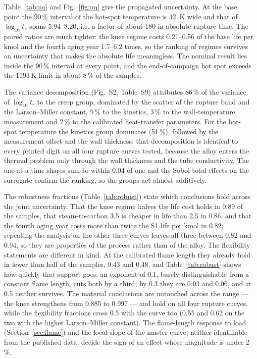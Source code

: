 \documentclass[final,3p,times]{elsarticle}
\begin{document}
Table~\ref{tab:uq} and Fig.~\ref{fig:uq} give the propagated uncertainty. At the base point the 90\,\% interval of the hot-spot temperature is 42~K wide and that of $\log_{10} t_r$ spans 5.94--8.20, i.e. a factor of about 180 in absolute rupture time. The paired ratios are much tighter: the knee regime costs 0.21--0.56 of the base life per kmol and the fourth aging year 1.7--6.2 times, so the ranking of regimes survives an uncertainty that makes the absolute life meaningless. The nominal result lies inside the 90\,\% interval at every point, and the end-of-campaign hot spot exceeds the 1193\,K limit in about 8\,\% of the samples.

The variance decomposition (Fig.~S2, Table~S9) attributes 86\,\% of the variance of $\log_{10} t_r$ to the creep group, dominated by the scatter of the rupture band and the Larson--Miller constant, 9\,\% to the kinetics, 3\,\% to the wall-temperature measurement and 2\,\% to the calibrated heat-transfer parameters. For the hot-spot temperature the kinetics group dominates (51\,\%), followed by the measurement offset and the wall thickness; that decomposition is identical to every printed digit on all four rupture curves tested, because the alloy enters the thermal problem only through the wall thickness and the tube conductivity. The one-at-a-time shares sum to within 0.04 of one and the Sobol total effects on the surrogate confirm the ranking, so the groups act almost additively.

The robustness fractions (Table~\ref{tab:robust}) state which conclusions hold across the joint uncertainty. That the knee regime halves the life cost holds in 0.89 of the samples, that steam-to-carbon 3.5 is cheaper in life than 2.5 in 0.86, and that the fourth aging year costs more than twice the S1 life per kmol in 0.82; repeating the analysis on the other three curves leaves all three between 0.82 and 0.94, so they are properties of the process rather than of the alloy. The flexibility statements are different in kind. At the calibrated flame length they already hold in fewer than half of the samples, 0.43 and 0.48, and Table~\ref{tab:robust} shows how quickly that support goes: an exponent of 0.1, barely distinguishable from a constant flame length, cuts both by a third; by 0.3 they are 0.03 and 0.06, and at 0.5 neither survives. The material conclusions are untouched across the range --- the knee strengthens from 0.885 to 0.997 --- and hold on all four rupture curves, while the flexibility fractions cross 0.5 with the curve too (0.55 and 0.62 on the two with the higher Larson--Miller constant). The flame-length response to load (Section~\ref{sec:flame}) and the local slope of the master curve, neither identifiable from the published data, decide the sign of an effect whose magnitude is under 2\,\%.
\end{document}
